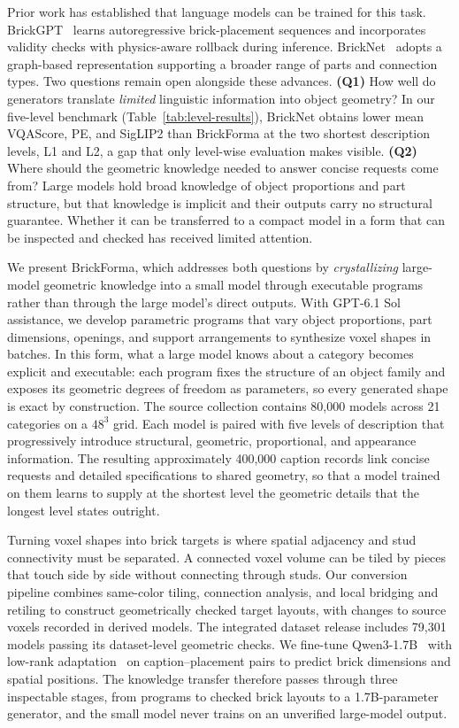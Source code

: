 Prior work has established that language models can be trained for this task. BrickGPT~\cite{brickgpt} learns autoregressive brick-placement sequences and incorporates validity checks with physics-aware rollback during inference. BrickNet~\cite{bricknet} adopts a graph-based representation supporting a broader range of parts and connection types. Two questions remain open alongside these advances. \textbf{(Q1)} How well do generators translate \emph{limited} linguistic information into object geometry? In our five-level benchmark (Table~\ref{tab:level-results}), BrickNet obtains lower mean VQAScore, PE, and SigLIP2 than BrickForma at the two shortest description levels, L1 and L2, a gap that only level-wise evaluation makes visible. \textbf{(Q2)} Where should the geometric knowledge needed to answer concise requests come from? Large models hold broad knowledge of object proportions and part structure, but that knowledge is implicit and their outputs carry no structural guarantee. Whether it can be transferred to a compact model in a form that can be inspected and checked has received limited attention.

We present BrickForma, which addresses both questions by \emph{crystallizing} large-model geometric knowledge into a small model through executable programs rather than through the large model's direct outputs. With GPT-6.1 Sol assistance, we develop parametric programs that vary object proportions, part dimensions, openings, and support arrangements to synthesize voxel shapes in batches.
In this form, what a large model knows about a category becomes explicit and executable: each program fixes the structure of an object family and exposes its geometric degrees of freedom as parameters, so every generated shape is exact by construction. The source collection contains 80,000 models across 21 categories on a $48^3$ grid. Each model is paired with five levels of description that progressively introduce structural, geometric, proportional, and appearance information. The resulting approximately 400,000 caption records link concise requests and detailed specifications to shared geometry, so that a model trained on them learns to supply at the shortest level the geometric details that the longest level states outright.

Turning voxel shapes into brick targets is where spatial adjacency and stud connectivity must be separated. A connected voxel volume can be tiled by pieces that touch side by side without connecting through studs. Our conversion pipeline combines same-color tiling, connection analysis, and local bridging and retiling to construct geometrically checked target layouts, with changes to source voxels recorded in derived models. The integrated dataset release includes 79,301 models passing its dataset-level geometric checks. We fine-tune Qwen3-1.7B~\cite{qwen3} with low-rank adaptation~\cite{lora} on caption--placement pairs to predict brick dimensions and spatial positions. The knowledge transfer therefore passes through three inspectable stages, from programs to checked brick layouts to a 1.7B-parameter generator, and the small model never trains on an unverified large-model output.


